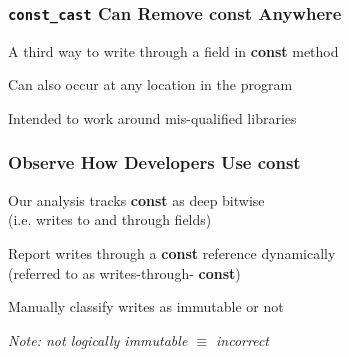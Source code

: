 \documentclass[aspectratio=43]{beamer}
\newcommand{\const}{{\color{blue} \bfseries \ttfamily const}}
\begin{document}
  \begin{frame}
    \frametitle{\texttt{const\_cast} Can Remove \const{} Anywhere}
    \large
    A third way to write through a field in \const{} method

    \vspace{2em}
    Can also occur at any location in the program

    \vspace{2em}
    Intended to work around mis-qualified libraries
  \end{frame}

  \begin{frame}
    \frametitle{Observe How Developers Use \const{}}

    \large

    Our analysis tracks \const{} as deep bitwise
    \\(i.e. writes to and through fields)

    \vspace{2em}
    Report writes through a \const{} reference dynamically
    \\(referred to as writes-through-\const{})

    \vspace{2em}
    {\color{yellow} Manually classify writes as  immutable
    or not}

    \vspace{2em}
    \textit{Note: not logically immutable $\equiv$ incorrect}
  \end{frame}
\end{document}
